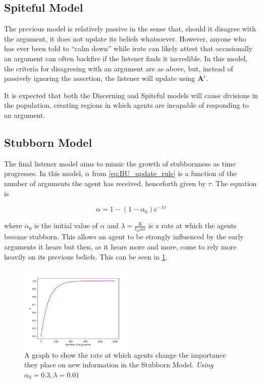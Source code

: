 \subsection*{Spiteful Model}

The previous model is relatively passive in the sense that, should it disagree with the argument, it does not update its beliefs whatsoever. However, anyone who has ever been told to ``calm down'' while irate can likely attest that occasionally an argument can often backfire if the listener finds it incredible. In this model, the criteria for disagreeing with an argument are as above, but, instead of passively ignoring the assertion, the listener will update using $\mathbf{A}^c$.

It is expected that both the Discerning and Spiteful models will cause divisions in the population, creating regions in which agents are incapable of responding to an argument. 



\subsection*{Stubborn Model}

The final listener model aims to mimic the growth of stubbornness as time progresses. In this model, $\alpha$ from \cref{eq:BU_update_rule} is a function of the number of arguments the agent has received, henceforth given by $\tau$. The equation is

\begin{equation}
    \alpha = 1 - (1 - \alpha_0) e^{-\lambda \tau}
\end{equation}

where $\alpha_0$ is the initial value of $\alpha$ and $\lambda = \frac{K}{t_max}$ is a rate at which the agents become stubborn. This allows an agent to be strongly influenced by the early arguments it hears but then, as it hears more and more, come to rely more heavily on its previous beliefs. This can be seen in \cref{fig:stubbornness_curve}. 


\begin{figure}[H]
    \centering
    \includegraphics[width=0.49\textwidth]{Images/Misc/Stubbornness.png}
    \caption{A graph to show the rate at which agents change the importance they place on new information in the Stubborn Model. \textit{Using $\alpha_0 = 0.3, \lambda = 0.01$}}
    \label{fig:stubbornness_curve}
\end{figure}